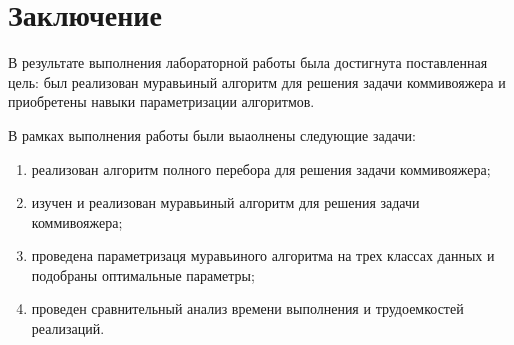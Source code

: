 \chapter*{Заключение}

В результате выполнения лабораторной работы была достигнута поставленная цель: был реализован муравьиный алгоритм для решения задачи коммивояжера и приобретены навыки параметризации алгоритмов.


В рамках выполнения работы были выаолнены следующие задачи: 
\begin{enumerate}[label={\arabic*)}]
	\item реализован алгоритм полного перебора для решения задачи коммивояжера;
	\item изучен и реализован муравьиный алгоритм для решения задачи коммивояжера;
	\item проведена параметризаця муравьиного алгоритма на трех классах данных и подобраны оптимальные параметры;
	\item проведен сравнительный анализ времени выполнения и трудоемкостей реализаций.


\end{enumerate}



